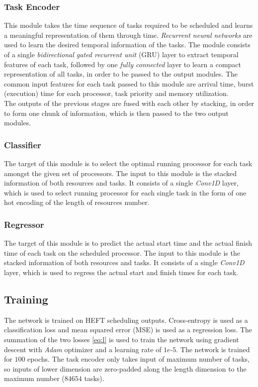\subsubsection{Task Encoder}
This module takes the time sequence of tasks required to be scheduled and learns a meaningful representation of them through time. \emph{Recurrent neural networks} are used to learn the desired temporal information of the tasks. The module consists of a single \emph{bidirectional gated recurrent unit} (GRU) \cite{chung2014empirical} layer to extract temporal features of each task, followed by one \emph{fully connected} layer to learn a compact representation of all tasks, in order to be passed to the output modules. The common input features for each task passed to this module are arrival time, burst (execution) time for each processor, task priority and memory utilization. \\

The outputs of the previous stages are fused with each other by stacking, in order to form one chunk of information, which is then passed to the two output modules. \\

\subsubsection{Classifier}
The target of this module is to select the optimal running processor for each task amongst the given set of processors. The input to this module is the stacked information of both resources and tasks. It consists of a single \emph{Conv1D} layer, which is used to select running processor for each single task in the form of one hot encoding of the length of resources number. \\

\subsubsection{Regressor}
The target of this module is to predict the actual start time and the actual finish time of each task on the scheduled processor. The input to this module is the stacked information of both resources and tasks. It consists of a single \emph{Conv1D} layer, which is used to regress the actual start and finish times for each task. 

\subsection{Training}
The network is trained on HEFT scheduling outputs. Cross-entropy is used as a classification loss and mean squared error (MSE) is used as a regression loss. The summation of the two losses \ref{eq:l} is used to train the network using gradient descent with \emph{Adam} optimizer and a learning rate of $1e$-$5$. The network is trained for $100$ epochs. The task encoder only takes input of maximum number of tasks, so inputs of lower dimension are zero-padded along the length dimension to the maximum number ($84654$ tasks). \\

